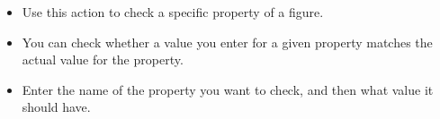 

\begin{itemize}
\item Use this action to check a specific property of a figure.
\item You can check whether a value you enter for a given property matches the actual value for the property.
\item Enter the name of the property you want to check, and then what value it should have. 
\end{itemize}
